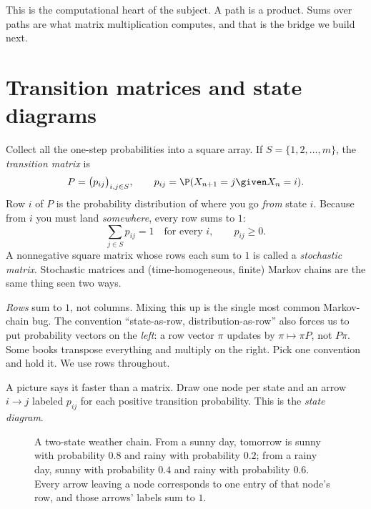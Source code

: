 This is the computational heart of the subject. A path is a product. Sums over paths are
what matrix multiplication computes, and that is the bridge we build next.

\section{Transition matrices and state diagrams}
\label{ch23:transition-matrix}

Collect all the one-step probabilities into a square array. If $S = \{1, 2, \dots, m\}$, the
\emph{transition matrix} is
\[
  P = \big(p_{ij}\big)_{i,j \in S},
  \qquad p_{ij} = \P(X_{n+1} = j \given X_n = i).
\]
Row $i$ of $P$ is the probability distribution of where you go \emph{from} state $i$. Because
from $i$ you must land \emph{somewhere}, every row sums to $1$:
\[
  \sum_{j \in S} p_{ij} = 1 \quad \text{for every } i, \qquad p_{ij} \ge 0.
\]
A nonnegative square matrix whose rows each sum to $1$ is called a \emph{stochastic matrix}.
Stochastic matrices and (time-homogeneous, finite) Markov chains are the same thing seen two
ways.

\begin{trapbox}
\emph{Rows} sum to $1$, not columns. Mixing this up is the single most common Markov-chain
bug. The convention ``state-as-row, distribution-as-row'' also forces us to put probability
vectors on the \emph{left}: a row vector $\pi$ updates by $\pi \mapsto \pi P$, not $P\pi$.
Some books transpose everything and multiply on the right. Pick one convention and hold it.
We use rows throughout.
\end{trapbox}

A picture says it faster than a matrix. Draw one node per state and an arrow $i \to j$
labeled $p_{ij}$ for each positive transition probability. This is the \emph{state diagram}.

\begin{figure}[H]
\centering
{}
\caption{A two-state weather chain. From a sunny day, tomorrow is sunny with probability
$0.8$ and rainy with probability $0.2$; from a rainy day, sunny with probability $0.4$ and
rainy with probability $0.6$. Every arrow leaving a node corresponds to one entry of that
node's row, and those arrows' labels sum to $1$.}
\label{ch23:fig-weather-diagram}
\end{figure}

